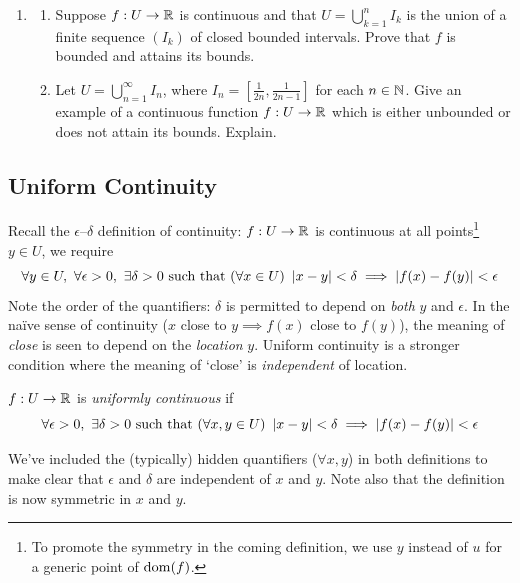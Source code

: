 \begin{exercises}
\begin{enumerate}
	\item\begin{enumerate}
	  \item Suppose $f:U\to\mathbb{R}$ is continuous and that $U=\bigcup\limits_{k=1}^nI_k$ is the union of a finite sequence $(I_k)$ of closed bounded intervals. Prove that $f$ is bounded and attains its bounds.
	  \item Let $U=\bigcup\limits_{n=1}^\infty I_n$, where $I_n=[\frac 1{2n},\frac 1{2n-1}]$ for each $n\in\mathbb{N}$. Give an example of a continuous function $f:U\to\mathbb{R}$ which is either unbounded or does not attain its bounds. Explain.
	\end{enumerate}
\end{enumerate}
\end{exercises}

\vspace*{50pt}\vfill\goodbreak

\subsection{Uniform Continuity}\label{sec:unifcont}

Recall the $\epsilon$--$\delta$ definition of continuity: $f:U\to\mathbb{R}$ is continuous at all points\footnote{To promote the symmetry in the coming definition, we use $y$ instead of $u$ for a generic point of $\operatorname{dom}(f)$.}
$y\in U$, we require
\[\forall y\in U,\ \forall\epsilon>0,\ \exists \delta>0\text{ such that }(\forall x\in U)\ \nm{x-y}<\delta\implies \nm{f(x)-f(y)}<\epsilon\]
Note the order of the quantifiers: $\delta$ is permitted to depend on \emph{both} $y$ and $\epsilon$. In the naïve sense of continuity ($x$ close to $y\implies f(x)$ close to $f(y)$), the meaning of \emph{close} is seen to depend on the \emph{location} $y$. Uniform continuity is a stronger condition where the meaning of `close' is \emph{independent} of location.

\begin{defn}{}{}
$f:U\to\mathbb{R}$ is \emph{uniformly continuous} if
\[\forall\epsilon>0,\ \exists \delta>0\text{ such that }(\forall x,y\in U)\ \nm{x-y}<\delta\implies \nm{f(x)-f(y)}<\epsilon\]
\end{defn}
We've included the (typically) hidden quantifiers ($\forall x,y$) in both definitions to make clear that $\epsilon$ and $\delta$ are independent of $x$ and $y$. Note also that the definition is now symmetric in $x$ and $y$.


